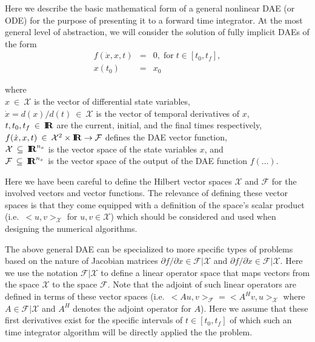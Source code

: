 \documentclass[pdf,ps2pdf,11pt]{SANDreport}
\begin{document}
Here we describe the basic mathematical form of a general nonlinear DAE (or
ODE) for the purpose of presenting it to a forward time integrator.  At the
most general level of abstraction, we will consider the solution of fully
implicit DAEs of the form
%
\begin{eqnarray}
f(\dot{x},x,t) & = & 0, \; \mbox{for} \; t \in [t_0, t_f], \label{rythmos:eqn:dae} \\
x(t_0) & = & x_0 \label{rythmos:eqn:dae:ic}
\end{eqnarray}
\begin{tabbing}
\hspace{4ex}where\hspace{5ex}\= \\
\>	$x\:\in\:\mathcal{X}$ is the vector of differential state variables, \\
\>	$\dot{x} = d(x)/d(t)\:\in\:\mathcal{X}$ is the vector of temporal derivatives of $x$, \\
\>	$t, t_0, t_f\:\in\:\mbox{\textbf{I}}\hspace{-0.6ex}\mbox{\textbf{R}}$ are the current, initial, and the final times respectively, \\
\>	$f(\dot{x},x,t)\:\in\:\mathcal{X}^2\times\mbox{\textbf{I}}\hspace{-0.6ex}\mbox{\textbf{R}}\rightarrow\mathcal{F}$ defines the DAE vector function, \\
\>	$\mathcal{X} \:\subseteq\:\mbox{\textbf{I}}\hspace{-0.6ex}\mbox{\textbf{R}}^{n_x}$ is the vector space of the state variables $x$, and \\
\>	$\mathcal{F} \:\subseteq\:\mbox{\textbf{I}}\hspace{-0.6ex}\mbox{\textbf{R}}^{n_x}$ is the vector space of the output of the DAE function $f(\ldots)$.
\end{tabbing}

Here we have been careful to define the Hilbert vector spaces $\mathcal{X}$
and $\mathcal{F}$ for the involved vectors and vector functions.  The
relevance of defining these vector spaces is that they come equipped with a
definition of the space's scalar product (i.e.\ $<u,v>_{\mathcal{X}}$ for
$u,v\in\mathcal{X}$) which should be considered and used when designing the
numerical algorithms.

The above general DAE can be specialized to more specific types of problems
based on the nature of Jacobian matrices ${}\partial f / {}\partial
{}\dot{x}\in\mathcal{F}|\mathcal{X}$ and ${}\partial f / {}\partial
{}\dot{x}\in\mathcal{F}|\mathcal{X}$.  Here we use the notation
$\mathcal{F}|\mathcal{X}$ to define a linear operator space that maps vectors
from the space $\mathcal{X}$ to the space $\mathcal{F}$.  Note that the
adjoint of such linear operators are defined in terms of these vector spaces
(i.e.\ $<A u,v>_{\mathcal{F}} = <A^H v,u>_{\mathcal{X}}$ where
$A\in\mathcal{F}|\mathcal{X}$ and $A^H$ denotes the adjoint operator for $A$).
Here we assume that these first derivatives exist for the specific intervals
of  $t\in[t_0,t_f]$ of which such an time integrator algorithm will be
directly applied the the problem.
\end{document}

